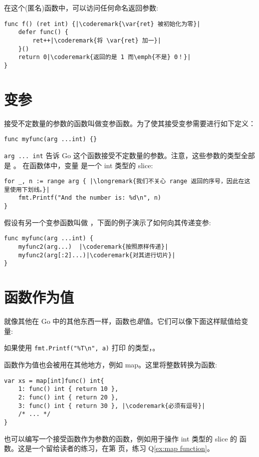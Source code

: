 在这个(匿名)函数中，可以访问任何命名返回参数:
\begin{lstlisting}[caption=在 defer 中访问返回值]
func f() (ret int) {|\coderemark{\var{ret} 被初始化为零}|
	defer func() {
		ret++|\coderemark{将 \var{ret} 加一}|
	}()
	return 0|\coderemark{返回的是 1 而\emph{不是} 0！}|
}
\end{lstlisting}

\section{变参}
接受不定数量的参数的函数叫做变参函数。为了使其接受变参需要进行如下定义：
\begin{lstlisting}
func myfunc(arg ...int) {}
\end{lstlisting}

\lstinline{arg ... int} 告诉 Go 这个函数接受不定数量的参数。注意，这些参数的类型全部是 。
在函数体中，变量  是一个 int 类型的 slice:
\begin{lstlisting}
for _, n := range arg { |\longremark{我们不关心 range 返回的序号，因此在这里使用下划线。}|
    fmt.Printf("And the number is: %d\n", n)
}
\end{lstlisting}
\showremarks

假设有另一个变参函数叫做 ，下面的例子演示了如何向其传递变参:
\begin{lstlisting}
func myfunc(arg ...int) {
    myfunc2(arg...)  |\coderemark{按照原样传递}|
    myfunc2(arg[:2]...)|\coderemark{对其进行切片}|
}
\end{lstlisting}

\section{函数作为值}
\label{sec:functions as values}

就像其他在 Go 中的其他东西一样，函数也\emph{是}值。它们可以像下面这样赋值给变
量:


如果使用 \lstinline{fmt.Printf("%T\n", a)} 打印  的类型，。

函数作为值也会被用在其他地方，例如 map。这里将整数转换为函数:
\begin{lstlisting}[caption=使用 map 的函数作为值]
var xs = map[int]func() int{
    1: func() int { return 10 },
    2: func() int { return 20 },
    3: func() int { return 30 }, |\coderemark{必须有逗号}|
    /* ... */
}
\end{lstlisting}
也可以编写一个接受函数作为参数的函数，例如用于操作 int 类型的 slice 的 
 函数。这是一个留给读者的练习，在第 \pageref{ex:map function} 
页，练习 Q\ref{ex:map function}。

